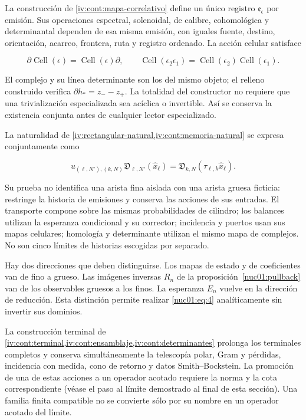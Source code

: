 La construcción de \cref{iv:cont:mapa-correlativo} define un único registro \(\mathfrak e_\epsilon\) por emisión. Sus operaciones espectral, solenoidal, de calibre, cohomológica y determinantal dependen de esa misma emisión, con iguales fuente, destino, orientación, acarreo, frontera, ruta y registro ordenado. La acción celular satisface

\[
\partial\operatorname{Cell}(\epsilon)=\operatorname{Cell}(\epsilon)\partial,
\qquad
\operatorname{Cell}(\epsilon_2\epsilon_1)
=\operatorname{Cell}(\epsilon_2)\operatorname{Cell}(\epsilon_1).
\]

El complejo y su línea determinante son los del mismo objeto; el relleno construido verifica \(\partial h_*=z_--z_+\). La totalidad del constructor no requiere que una trivialización especializada sea acíclica o invertible. Así se conserva la existencia conjunta antes de cualquier lector especializado.

La naturalidad de \cref{iv:rectangular-natural,iv:cont:memoria-natural} se expresa conjuntamente como

\begin{equation}
u_{(\ell,N'),(k,N)}\mathfrak D_{\ell,N'}(\widehat x_\ell)
=\mathfrak D_{k,N}(\tau_{\ell,k}\widehat x_\ell).
\label{nuc01:eq:4}
\end{equation}

Su prueba no identifica una arista fina aislada con una arista gruesa ficticia: restringe la historia de emisiones y conserva las acciones de sus entradas. El transporte compone sobre las mismas probabilidades de cilindro; los balances utilizan la esperanza condicional y su corrector; incidencia y puertos usan sus mapas celulares; homología y determinante utilizan el mismo mapa de complejos. No son cinco límites de historias escogidas por separado.

Hay dos direcciones que deben distinguirse. Los mapas de estado y de coeficientes van de fino a grueso. Las imágenes inversas \(R_n\) de la proposición~\ref{nuc01:pullback} van de los observables gruesos a los finos. La esperanza \(E_n\) vuelve en la dirección de reducción. Esta distinción permite realizar \eqref{nuc01:eq:4} analíticamente sin invertir sus dominios.

La construcción terminal de \cref{iv:cont:terminal,iv:cont:ensamblaje,iv:cont:determinantes} prolonga los terminales completos y conserva simultáneamente la telescopía polar, Gram y pérdidas, incidencia con medida, cono de retorno y datos Smith–Bockstein. La promoción de una de estas acciones a un operador acotado requiere la norma y la cota correspondiente (véase el paso al límite demostrado al final de esta sección). Una familia finita compatible no se convierte sólo por su nombre en un operador acotado del límite.

